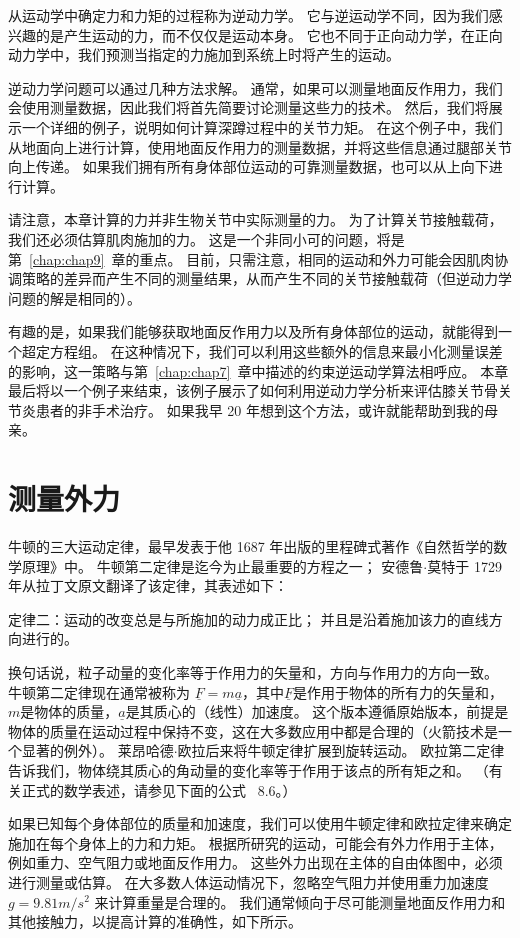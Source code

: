 从运动学中确定力和力矩的过程称为逆动力学。
它与逆运动学不同，因为我们感兴趣的是产生运动的力，而不仅仅是运动本身。
它也不同于正向动力学，在正向动力学中，我们预测当指定的力施加到系统上时将产生的运动。


逆动力学问题可以通过几种方法求解。
通常，如果可以测量地面反作用力，我们会使用测量数据，因此我们将首先简要讨论测量这些力的技术。
然后，我们将展示一个详细的例子，说明如何计算深蹲过程中的关节力矩。
在这个例子中，我们从地面向上进行计算，使用地面反作用力的测量数据，并将这些信息通过腿部关节向上传递。
如果我们拥有所有身体部位运动的可靠测量数据，也可以从上向下进行计算。


请注意，本章计算的力并非生物关节中实际测量的力。
为了计算关节接触载荷，我们还必须估算肌肉施加的力。
这是一个非同小可的问题，将是第~\ref{chap:chap9}~章的重点。
目前，只需注意，相同的运动和外力可能会因肌肉协调策略的差异而产生不同的测量结果，从而产生不同的关节接触载荷（但逆动力学问题的解是相同的）。


有趣的是，如果我们能够获取地面反作用力以及所有身体部位的运动，就能得到一个超定方程组。
在这种情况下，我们可以利用这些额外的信息来最小化测量误差的影响，这一策略与第~\ref{chap:chap7}~章中描述的约束逆运动学算法相呼应。
本章最后将以一个例子来结束，该例子展示了如何利用逆动力学分析来评估膝关节骨关节炎患者的非手术治疗。
如果我早 20 年想到这个方法，或许就能帮助到我的母亲。



\section{测量外力}

牛顿的三大运动定律，最早发表于他 1687 年出版的里程碑式著作《自然哲学的数学原理》中。
牛顿第二定律是迄今为止最重要的方程之一；
安德鲁$\cdot$莫特于 1729 年从拉丁文原文翻译了该定律，其表述如下：


定律二：运动的改变总是与所施加的动力成正比；
并且是沿着施加该力的直线方向进行的。


换句话说，粒子动量的变化率等于作用力的矢量和，方向与作用力的方向一致。
牛顿第二定律现在通常被称为 $\underline{F} = m \underline{a}$，其中$\underline{F}$是作用于物体的所有力的矢量和，$m$是物体的质量，$\underline{a}$是其质心的（线性）加速度。
这个版本遵循原始版本，前提是物体的质量在运动过程中保持不变，这在大多数应用中都是合理的（火箭技术是一个显著的例外）。
莱昂哈德$\cdot$欧拉后来将牛顿定律扩展到旋转运动。
欧拉第二定律告诉我们，物体绕其质心的角动量的变化率等于作用于该点的所有矩之和。
（有关正式的数学表述，请参见下面的公式~ 8.6。）


如果已知每个身体部位的质量和加速度，我们可以使用牛顿定律和欧拉定律来确定施加在每个身体上的力和力矩。
根据所研究的运动，可能会有外力作用于主体，例如重力、空气阻力或地面反作用力。
这些外力出现在主体的自由体图中，必须进行测量或估算。
在大多数人体运动情况下，忽略空气阻力并使用重力加速度 $g = 9.81 m/s^2$ 来计算重量是合理的。
我们通常倾向于尽可能测量地面反作用力和其他接触力，以提高计算的准确性，如下所示。



